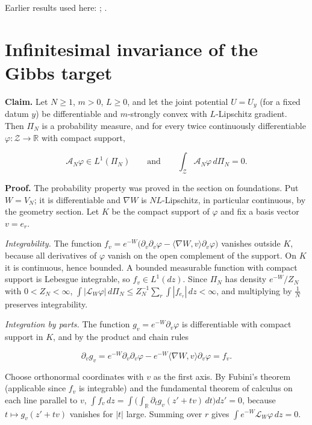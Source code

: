 \documentclass[11pt,a4paper]{article}
\begin{document}
Earlier results used here: \cite[Section~3.46.14]{LangevinLean2026ULASC}; \cite[Section~3.46.2]{LangevinLean2026ULASC}.

\section{\texorpdfstring{Infinitesimal invariance of the Gibbs target}{Infinitesimal invariance of the Gibbs target}}


\textbf{Claim.} Let \(N\ge1\), \(m>0\), \(L\ge0\), and let the joint potential \(U=U_y\) (for a fixed datum \(y\)) be differentiable and \(m\)-strongly convex with \(L\)-Lipschitz gradient. Then \(\Pi_N\) is a probability measure, and for every twice continuously differentiable \(\varphi:\mathcal Z\to\mathbb R\) with compact support,


\[\mathcal A_N\varphi\in L^1(\Pi_N)\qquad\text{and}\qquad\int_{\mathcal Z}\mathcal A_N\varphi\,d\Pi_N=0 .\]


\textbf{Proof.} The probability property was proved in the section on foundations. Put \(W=V_N\); it is differentiable and \(\nabla W\) is \(NL\)-Lipschitz, in particular continuous, by the geometry section. Let \(K\) be the compact support of \(\varphi\) and fix a basis vector \(v=e_r\).




\emph{Integrability.} The function \(f_v=e^{-W}\bigl(\partial_v\partial_v\varphi-\langle\nabla W,v\rangle\partial_v\varphi\bigr)\) vanishes outside \(K\), because all derivatives of \(\varphi\) vanish on the open complement of the support. On \(K\) it is continuous, hence bounded. A bounded measurable function with compact support is Lebesgue integrable, so \(f_v\in L^1(dz)\). Since \(\Pi_N\) has density \(e^{-W}/Z_N\) with \(0<Z_N<\infty\), \(\int|\mathcal L_W\varphi|\,d\Pi_N\le Z_N^{-1}\sum_r\int|f_{e_r}|\,dz<\infty\), and multiplying by \(\frac1N\) preserves integrability.




\emph{Integration by parts.} The function \(g_v=e^{-W}\partial_v\varphi\) is differentiable with compact support in \(K\), and by the product and chain rules


\[\partial_vg_v=e^{-W}\partial_v\partial_v\varphi-e^{-W}\langle\nabla W,v\rangle\partial_v\varphi=f_v .\]


Choose orthonormal coordinates with \(v\) as the first axis. By Fubini's theorem (applicable since \(f_v\) is integrable) and the fundamental theorem of calculus on each line parallel to \(v\), \(\int f_v\,dz=\int\bigl(\int_{\mathbb R}\partial_tg_v(z'+tv)\,dt\bigr)dz'=0\), because \(t\mapsto g_v(z'+tv)\) vanishes for \(|t|\) large. Summing over \(r\) gives \(\int e^{-W}\mathcal L_W\varphi\,dz=0\).
\end{document}
